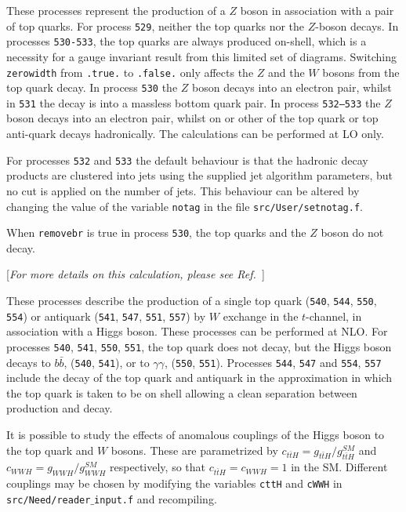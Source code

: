 \label{subsec:ztt}

These processes represent the production of a $Z$ boson in association
with a pair of top quarks.
For process {\tt 529}, neither the top quarks nor the $Z$-boson
decays. 
In processes {\tt 530-533}, the top quarks are always
produced on-shell, which is a necessity for a gauge invariant result
from this limited set of diagrams.
Switching {\tt zerowidth} from {\tt .true.} to {\tt .false.} only affects
the $Z$ and the $W$ bosons from the top quark decay.
In process {\tt 530} the $Z$ boson decays into an electron pair, whilst
in {\tt 531} the decay is into a massless bottom quark pair.
In process {\tt 532--533} the $Z$ boson decays into an electron pair, whilst
on or other of the top quark or top anti-quark decays hadronically.
The calculations can be performed at LO only.

For processes {\tt 532} and {\tt 533} the default behaviour is that the hadronic decay products
are clustered into jets using the supplied jet
algorithm parameters, but no cut is applied on the number of jets.
This behaviour can be altered by changing the value of the
variable {\tt notag} in the file {\tt src/User/setnotag.f}.

When {\tt removebr} is true in process {\tt 530}, the top quarks and the $Z$ boson do not decay.


\begin{center}
[{\it For more details on this calculation, please see Ref.~\cite{Campbell:2013yla}}]
\end{center}

\label{subsec:Ht}
These processes describe the production of a single top quark ({\tt 540}, {\tt 544}, {\tt 550},
{\tt 554}) or antiquark ({\tt 541}, {\tt 547}, {\tt 551}, {\tt 557}) by $W$ exchange in the
$t$-channel, in association with a Higgs boson. These processes can be performed at NLO.
For processes {\tt 540}, {\tt 541}, {\tt 550},
{\tt 551}, the top quark does not decay, but the
Higgs boson decays to $b\bar{b}$, ({\tt 540}, {\tt 541}), or to $\gamma \gamma$, ({\tt 550}, {\tt 551}).
Processes {\tt 544}, {\tt 547} and {\tt 554}, {\tt 557} include the decay of the top quark and antiquark
in the approximation in which the top quark is taken to be on shell allowing a clean separation
between production and decay. 

It is possible to study the effects of anomalous couplings of the Higgs boson to the top quark and $W$ bosons. These 
are parametrized by $c_{t\bar{t}H} = g_{t\bar{t}H}/g_{t\bar{t}H}^{SM}$ and $c_{WWH} = g_{WWH}/g_{WWH}^{SM}$ 
respectively, so that $c_{t\bar{t}H}=c_{WWH}=1$ in the SM. Different couplings may be chosen by modifying the variables 
{\tt cttH} and {\tt cWWH} in {\tt src/Need/reader$\_$input.f} and recompiling.

